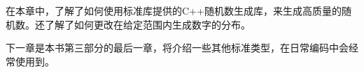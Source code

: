 在本章中，了解了如何使用标准库提供的C++随机数生成库，来生成高质量的随机数。还了解了如何更改在给定范围内生成数字的分布。

下一章是本书第三部分的最后一章，将介绍一些其他标准类型，在日常编码中会经常使用到。
